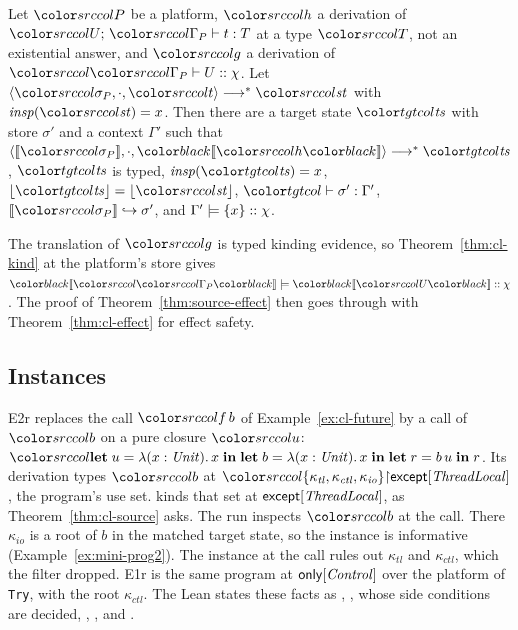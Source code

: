\begin{theorem}\label{thm:cl-source}
Let $\plat$ be a platform, $\src{h}$ a derivation of $\dtyuj{U}{\platctx}{t}{T}$ at a type $\src{T}$, not an existential answer, and $\src{g}$ a derivation of $\kindsj{\platctx}{U}{\chi}$. Let $\mst{\platstore}{\cdot}{\src{t}} \steps \src{\mathit{st}}$ with $\insp{\src{\mathit{st}}} = x$. Then there are a target state $\tstate$ with store $\sigma'$ and a context $\Gamma'$ such that $\mst{\tplatstore}{\cdot}{\trans{h}} \steps \tstate$, $\tstate$ is typed, $\insp{\tstate} = x$, $\erase{\tstate} = \erase{\src{\mathit{st}}}$, $\storej{\sigma'}{\Gamma'}$, $\sext{\tplatstore}{\sigma'}$, and $\Gamma' \models \{x\} :: \chi$.
\end{theorem}

The translation of $\src{g}$ is typed kinding evidence, so Theorem~\ref{thm:cl-kind} at the platform's store gives $\kindle{\trans{\platctx}}{\trans{U}}{\chi}$. The proof of Theorem~\ref{thm:source-effect} then goes through with Theorem~\ref{thm:cl-effect} for effect safety.

\subsection{Instances}\label{sec:cl-instances}

\begin{example}\label{ex:cl-try}
E2r replaces the call $\src{f\,b}$ of Example~\ref{ex:cl-future} by a call of $\src{b}$ on a pure closure $\src{u}$: $\src{\klet u = \lambda(x : \Unit).\,x \kin \klet b = \lambda(x : \Unit).\,x \kin \klet r = b\,u \kin r}$. Its derivation types $\src{b}$ at $\src{\restr{\cset{\kappa_{\mathit{tl}}, \kappa_{\mathit{ctl}}, \kappa_{\mathit{io}}}}{\kexcept{\mathit{ThreadLocal}}}}$, the program's use set.  kinds that set at $\mathsf{except}[\mathit{ThreadLocal}]$, as Theorem~\ref{thm:cl-source} asks. The run inspects $\src{b}$ at the call. There $\kappa_{\mathit{io}}$ is a root of $b$ in the matched target state, so the instance is informative (Example~\ref{ex:mini-prog2}). The instance at the call rules out $\kappa_{\mathit{tl}}$ and $\kappa_{\mathit{ctl}}$, which the filter dropped. E1r is the same program at $\mathsf{only}[\mathit{Control}]$ over the platform of \lstinline{Try}, with the root $\kappa_{\mathit{ctl}}$. The Lean states these facts as , , whose side conditions are decided, , ,  and .
\end{example}

